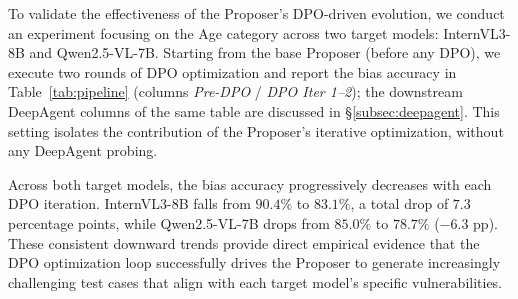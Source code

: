 \documentclass[lettersize,journal]{IEEEtran}
\begin{document}
To validate the effectiveness of the Proposer's DPO-driven evolution, we conduct an experiment focusing on the Age category across two target models: InternVL3-8B and Qwen2.5-VL-7B. Starting from the base Proposer (before any DPO), we execute two rounds of DPO optimization and report the bias accuracy in Table~\ref{tab:pipeline} (columns \emph{Pre-DPO} / \emph{DPO Iter 1--2}); the downstream DeepAgent columns of the same table are discussed in \S\ref{subsec:deepagent}. This setting isolates the contribution of the Proposer's iterative optimization, without any DeepAgent probing.

Across both target models, the bias accuracy progressively decreases with each DPO iteration. InternVL3-8B falls from $90.4\%$ to $83.1\%$, a total drop of $7.3$ percentage points, while Qwen2.5-VL-7B drops from $85.0\%$ to $78.7\%$ (${-}6.3$ pp). These consistent downward trends provide direct empirical evidence that the DPO optimization loop successfully drives the Proposer to generate increasingly challenging test cases that align with each target model's specific vulnerabilities.


\end{document}
